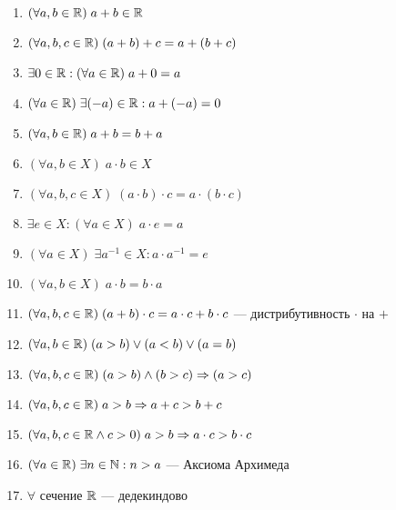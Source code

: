 \documentclass{article}
\begin{document}
\begin{enumerate}[label=\Roman*.]
	\item{}$(\forall a, b\in\mathbb{R})\;a+b\in\mathbb{R}$
	\item$(\forall a,b,c\in\mathbb{R})\;(a+b)+c=a+(b+c)$
	\item$\exists 0\in\mathbb{R}:(\forall a\in\mathbb{R})\;a+0=a$
	\item$(\forall a\in\mathbb{R})\;\exists (-a)\in\mathbb{R}:a+(-a)=0$
	\item{}$(\forall a, b\in\mathbb{R})\;a+b=b+a$
	\item{}$(\forall a, b\in X)\;a\cdot b\in X$
	\item$(\forall a,b,c\in X)\;(a\cdot b)\cdot c=a\cdot(b\cdot c)$
	\item$\exists e\in X:(\forall a\in X)\;a\cdot e=a$
	\item$(\forall a\in X)\;\exists a^{-1}\in X:a\cdot a^{-1}=e$
	\item{}$(\forall a, b\in X)\;a\cdot b=b\cdot a$
	\item$(\forall a,b,c\in\mathbb{R})\;(a+b)\cdot c=a\cdot c+b\cdot c$ --- дистрибутивность $\cdot$ на $+$
	\item{}$(\forall a,b\in\mathbb{R})\;(a>b)\lor (a<b)\lor (a=b)$
	\item$(\forall a,b,c\in\mathbb{R})\;(a>b)\land(b>c)\Rightarrow (a>c)$
	\item$(\forall a,b,c\in\mathbb{R})\;a>b\Rightarrow a+c>b+c$
	\item{}$(\forall a,b,c\in\mathbb{R} \land c>0)\;a>b\Rightarrow a\cdot c>b\cdot c$
	\item$(\forall a\in\mathbb{R})\;\exists n\in\mathbb{N}:n>a$ --- Аксиома Архимеда
	\item$\forall$ сечение $\mathbb{R}$ --- дедекиндово
\end{enumerate}

\newcommand{\markax}[3]{
	\draw [decorate, decoration={brace}] ($({pic cs:#1}) + (19em, 1em)$) -- ($({pic cs:#2}) + (19em,0)$)
	node [midway, right] {#3};
}
\end{document}

